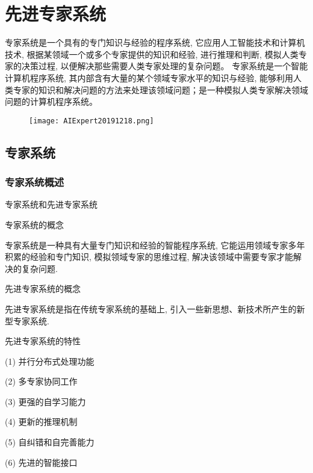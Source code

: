 \chapter{先进专家系统}\label{AIChapter10}
\begin{tcolorbox}[colback=white!50,colframe=orange!50,title=专家系统]
专家系统是一个具有的专门知识与经验的程序系统, 它应用人工智能技术和计算机技术, 根据某领域一个或多个专家提供的知识和经验, 进行推理和判断, 模拟人类专家的决策过程, 以便解决那些需要人类专家处理的复杂问题。
专家系统是一个智能计算机程序系统, 其内部含有大量的某个领域专家水平的知识与经验, 能够利用人类专家的知识和解决问题的方法来处理该领域问题；是一种模拟人类专家解决领域问题的计算机程序系统。
\end{tcolorbox}
\begin{figure}[H]
\centering
\texttt{[image: AIExpert20191218.png]}
\label{AIExpert20191218}
\end{figure}

\section{专家系统}
\subsection{专家系统概述}
专家系统和先进专家系统

专家系统的概念

    专家系统是一种具有大量专门知识和经验的智能程序系统, 它能运用领域专家多年积累的经验和专门知识, 模拟领域专家的思维过程, 解决该领域中需要专家才能解决的复杂问题.

先进专家系统的概念

    先进专家系统是指在传统专家系统的基础上, 引入一些新思想、新技术所产生的新型专家系统.

先进专家系统的特性

    (1) 并行分布式处理功能

    (2) 多专家协同工作

    (3) 更强的自学习能力

    (4) 更新的推理机制

    (5) 自纠错和自完善能力

    (6) 先进的智能接口

